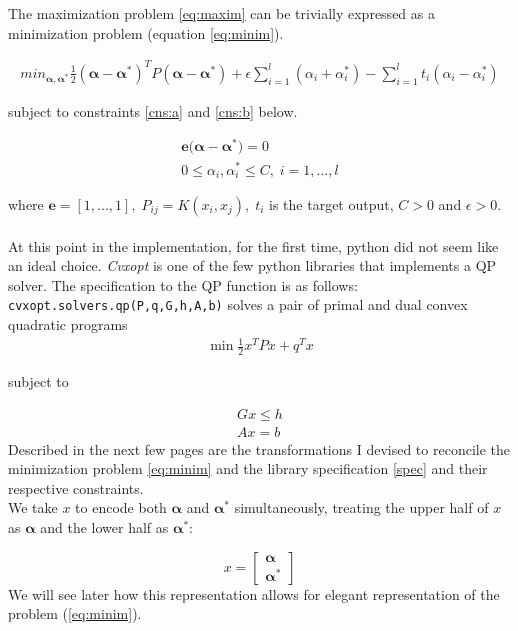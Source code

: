 \documentclass[12pt,notitlepage,twoside]{scrreprt}
\begin{document}
The maximization problem \ref{eq:maxim} can be
trivially expressed as a minimization problem (equation \ref{eq:minim}).

\begin{gather}\label{eq:minim} min_{\bm{\alpha},\bm{\alpha^*}}
  \frac{1}{2}(\bm{\alpha-\alpha^*})^T P (\bm{\alpha - \alpha^*})+\epsilon
  \sum_{i=1}^{l}(\alpha_i+\alpha_i^*)-\sum_{i=1}^{l}t_i(\alpha_i-\alpha_i^*)
\end{gather}

subject to constraints \ref{cns:a} and \ref{cns:b} below.

\begin{gather} \mathbf{e(\bm{\alpha}}-\bm{\alpha^*})=0 \label{cns:a}\\ 0\leq
  \alpha_i,\alpha_i^* \leq C, \;i=1,...,l \label{cns:b} \end{gather}

where \(\mathbf{e}=[1,...,1],\;P_{ij}=K(x_i,x_j),\;t_i\) is the target output,
\(C > 0\) and \(\epsilon > 0.\) \paragraph*{} At this point in the
implementation, for the first time, python did not seem like an ideal choice.
\textit{Cvxopt} is one of the few python libraries that implements a QP solver.
The specification to the QP function is as follows:
\texttt{cvxopt.solvers.qp(P,q,G,h,A,b)} solves a pair of primal and dual convex
quadratic programs \begin{gather} \label{spec} \min \frac{1}{2} x^T P x + q^T x
\end{gather}

 subject to

\begin{gather} G x \leq h\\ Ax = b \end{gather} Described in the next few pages
are the transformations I devised to reconcile the minimization problem
\ref{eq:minim} and the library specification \ref{spec} and their respective
constraints.\\ We take \(x\) to encode both \(\bm{\alpha}\) and
\(\bm{\alpha^*}\) simultaneously, treating the upper half of \(x\) as
\(\bm{\alpha}\) and the lower half as \(\bm{\alpha^*}\):


\[x =
  \begin{bmatrix}
    \bm{ \alpha} \\
    \bm{ \alpha^*}
  \end{bmatrix}
\]
We will see later how this representation allows for elegant representation of
the problem (\ref{eq:minim}).
\end{document}
